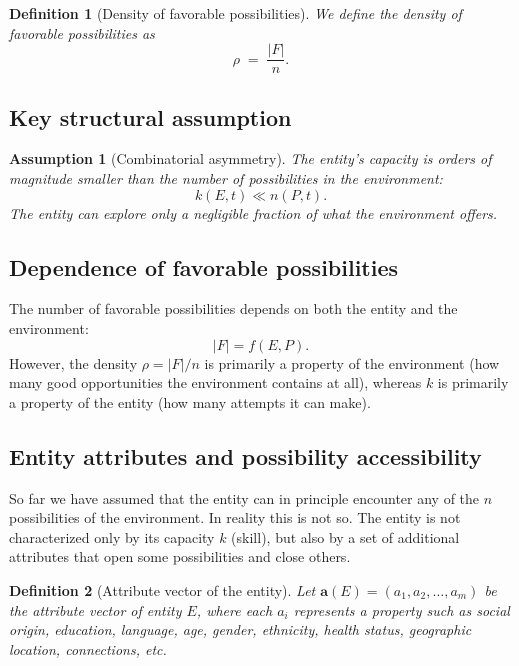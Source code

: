 \documentclass[12pt,a4paper]{article}
\newtheorem{definition}{Definition}[section]
\newtheorem{assumption}{Assumption}[section]
\begin{document}
\begin{definition}[Density of favorable possibilities]
We define the density of favorable possibilities as
\begin{equation}
    \rho \;=\; \frac{|F|}{n}.
\end{equation}
\end{definition}

\subsection{Key structural assumption}

\begin{assumption}[Combinatorial asymmetry]\label{asp:asymetria}
The entity's capacity is orders of magnitude smaller than the number of possibilities in the environment:
\begin{equation}
    k(E, t) \ll n(P, t).
\end{equation}
The entity can explore only a negligible fraction of what the environment offers.
\end{assumption}

\subsection{Dependence of favorable possibilities}

The number of favorable possibilities depends on both the entity and the environment:
\begin{equation}
    |F| = f(E, P).
\end{equation}
However, the density $\rho = |F|/n$ is primarily a property of the environment (how many good opportunities the environment contains at all), whereas $k$ is primarily a property of the entity (how many attempts it can make).

\subsection{Entity attributes and possibility accessibility}

So far we have assumed that the entity can in principle encounter any of the $n$ possibilities of the environment. In reality this is not so. The entity is not characterized only by its capacity $k$ (skill), but also by a set of additional attributes that open some possibilities and close others.

\begin{definition}[Attribute vector of the entity]
Let $\mathbf{a}(E) = (a_1, a_2, \dots, a_m)$ be the attribute vector of entity $E$, where each $a_i$ represents a property such as social origin, education, language, age, gender, ethnicity, health status, geographic location, connections, etc.
\end{definition}
\end{document}
